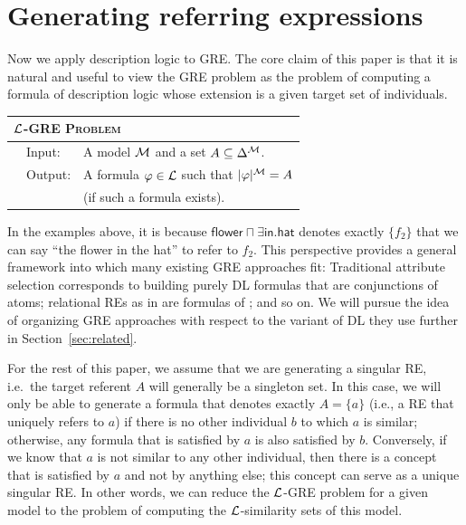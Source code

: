 \section{Generating referring expressions} \label{sec:gre}

Now we apply description logic to GRE.  The core claim of this paper
is that it is natural and useful to view the GRE problem as the
problem of computing a formula of description logic whose extension is
a given target set of individuals.

\medskip
\noindent
{\small
\begin{center}
\begin{tabular}{ll} \hline
\multicolumn{2}{l}{
\textsc{$\mathcal{L}$-GRE Problem}}\\ \hline
\ \ Input: & A model $\mathcal{M}$ and a set $A \subseteq \Delta^{\mathcal{M}}$.\\
\ \ Output: & A formula $\varphi \in \mathcal{L}$ such that $|\varphi|^{\mathcal{M}} = A$\\
& \hspace*{0.5cm} (if such a formula exists).\\ \hline
\end{tabular}
\end{center}}
\medskip

In the examples above, it is because $\mathsf{flower} \sqcap \exists
\mathsf{in}. \mathsf{hat}$ denotes exactly $\{f_2\}$ that we can say
``the flower in the hat'' to refer to $f_2$.  This perspective
provides a general framework into which many existing GRE approaches
fit: Traditional attribute selection \cite{Dale1995} corresponds to
building purely DL formulas that are conjunctions of atoms; relational
REs as in  are
formulas of \el; and so on.  We will pursue the idea of organizing GRE
approaches with respect to the variant of DL they use further in
Section~\ref{sec:related}.

For the rest of this paper, we assume that we are generating a
singular RE, i.e.\ the target referent $A$ will generally be a
singleton set.  In this case, we will only be able to generate a
formula that denotes exactly $A = \{a\}$ (i.e., a RE that uniquely
refers to $a$) if there is no other individual $b$ to which $a$ is
similar; otherwise, any formula that is satisfied by $a$ is also
satisfied by $b$.  Conversely, if we know that $a$ is not similar to
any other individual, then there is a concept that is satisfied by $a$
and not by anything else; this concept can serve as a unique singular
RE.  In other words, we can reduce the $\mathcal{L}$-GRE problem for a given
model to the problem of computing the $\mathcal{L}$-similarity sets of this
model.

